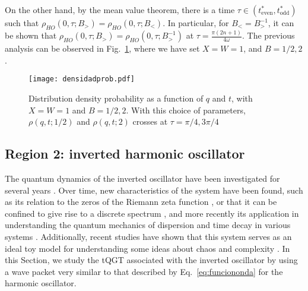 \documentclass[12pt]{iopart}
\begin{document}
On the other hand, by the mean value theorem, there is a time $\tau\in(t^*_{\text{even}},t^*_{\text{odd}})$  such that $\rho_{HO}(0,\tau;B_>)=\rho_{HO}(0,\tau;B_<)$. In particular, for $B_<=B_>^{-1}$, it can be shown that \break $\rho_{HO}(0,\tau;B_>)=\rho_{HO}(0,\tau;B_>^{-1})$  at $\tau=\tfrac{\pi(2n+1)}{4\omega}$.  The previous analysis can be observed in Fig.~\ref{densidadprob}, where we have set $X=W=1$, and $B=1/2,2$.
\begin{figure}[H]
    \centering
    \texttt{[image: densidadprob.pdf]}
    \captionsetup{font=small} 
    \caption{\justifying Distribution density probability  as a function of $q$ and $t$, with $X=W=1$ and $B=1/2,2$. With this choice of parameters, $\rho(q,t;1/2)$ and $\rho(q,t;2)$ crosses at $\tau=\pi/4,3\pi/4$ }
    \label{densidadprob}
\end{figure}



\subsection{Region 2: inverted harmonic oscillator}

The quantum dynamics of the inverted oscillator have been investigated for several years \cite{Barton}. Over time, new characteristics of the system have been found, such as its relation to the zeros of the Riemann zeta function \cite {Osinv01}, or that it can be confined to give rise to a discrete spectrum \cite{Yuce}, and more recently its application in understanding the quantum mechanics of dispersion and time decay in various systems \cite{Osinv02}. Additionally, recent studies have shown that this system serves as an ideal toy model for understanding some ideas about chaos and complexity \cite{Osinv1, Osinv2, Osinv3}.
In this Section, we study the tQGT associated with the inverted oscillator by using a wave packet very similar to that described by Eq.~\eqref{eq:funciononda} for the harmonic oscillator. 
\end{document}
